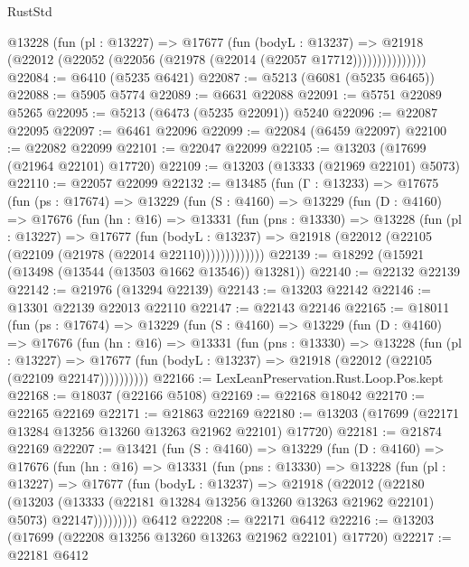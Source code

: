 \begin{lexlean}{RustStd}
\begin{coremodule}
                @13228
                  (fun (pl : @13227) =>
                  @17677
                    (fun (bodyL : @13237) =>
                    @21918 (@22012 (@22052 (@22056 (@21978 (@22014 (@22057 @17712)))))))))))))))
@22084 := @6410 (@5235 @6421)
@22087 := @5213 (@6081 (@5235 @6465))
@22088 := @5905 @5774
@22089 := @6631 @22088
@22091 := @5751 @22089 @5265
@22095 := @5213 (@6473 (@5235 @22091)) @5240
@22096 := @22087 @22095
@22097 := @6461 @22096
@22099 := @22084 (@6459 @22097)
@22100 := @22082 @22099
@22101 := @22047 @22099
@22105 := @13203 (@17699 (@21964 @22101) @17720)
@22109 := @13203 (@13333 (@21969 @22101) @5073)
@22110 := @22057 @22099
@22132 := @13485
    (fun (Γ : @13233) =>
    @17675
      (fun (ps : @17674) =>
      @13229
        (fun (S : @4160) =>
        @13229
          (fun (D : @4160) =>
          @17676
            (fun (hn : @16) =>
            @13331
              (fun (pns : @13330) =>
              @13228
                (fun (pl : @13227) =>
                @17677
                  (fun (bodyL : @13237) =>
                  @21918 (@22012 (@22105 (@22109 (@21978 (@22014 @22110)))))))))))))
@22139 := @18292 (@15921 (@13498 (@13544 (@13503 @1662 @13546)) @13281))
@22140 := @22132 @22139
@22142 := @21976 (@13294 @22139)
@22143 := @13203 @22142
@22146 := @13301 @22139 @22013 @22110
@22147 := @22143 @22146
@22165 := @18011
    (fun (ps : @17674) =>
    @13229
      (fun (S : @4160) =>
      @13229
        (fun (D : @4160) =>
        @17676
          (fun (hn : @16) =>
          @13331
            (fun (pns : @13330) =>
            @13228
              (fun (pl : @13227) =>
              @17677 (fun (bodyL : @13237) => @21918 (@22012 (@22105 (@22109 @22147))))))))))
@22166 := LexLeanPreservation.Rust.Loop.Pos.kept
@22168 := @18037 (@22166 @5108)
@22169 := @22168 @18042
@22170 := @22165 @22169
@22171 := @21863 @22169
@22180 := @13203 (@17699 (@22171 @13284 @13256 @13260 @13263 @21962 @22101) @17720)
@22181 := @21874 @22169
@22207 := @13421
    (fun (S : @4160) =>
    @13229
      (fun (D : @4160) =>
      @17676
        (fun (hn : @16) =>
        @13331
          (fun (pns : @13330) =>
          @13228
            (fun (pl : @13227) =>
            @17677
              (fun (bodyL : @13237) =>
              @21918
                (@22012
                  (@22180
                    (@13203
                      (@13333 (@22181 @13284 @13256 @13260 @13263 @21962 @22101) @5073)
                      @22147)))))))))
    @6412
@22208 := @22171 @6412
@22216 := @13203 (@17699 (@22208 @13256 @13260 @13263 @21962 @22101) @17720)
@22217 := @22181 @6412

\end{coremodule}
\end{lexlean}
